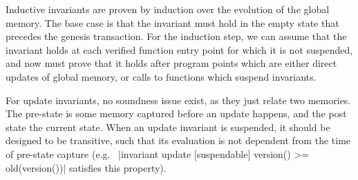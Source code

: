 Inductive invariants are proven by induction over the evolution of the global
memory. The base case is that the invariant must hold in the empty state that
precedes the genesis transaction.  For the induction step, we can assume that
the invariant holds at each verified function entry point for which it is not
suspended, and now must prove that it holds after program points which are
either direct updates of global memory, or calls to functions which suspend
invariants.

For update invariants, no soundness issue exist, as they just relate two
memories.  The pre-state is some memory captured before an update happens, and
the post state the current state. When an update invariant is suspended, it
should be designed to be transitive, such that its evaluation is not dependent
from the time of pre-state capture (e.g.~%
|invariant update [suspendable] version() >= old(version())| satisfies this
property).






